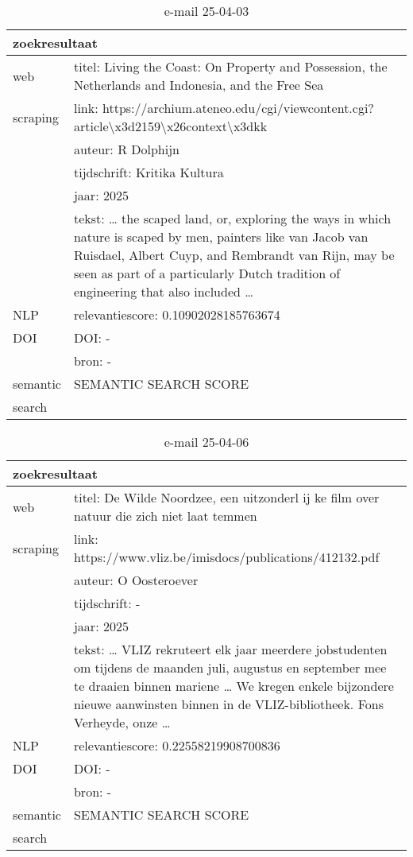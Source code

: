 \begin{table}[h!]
    \caption{e-mail 25-04-03}
    \centering
    \begin{tabularx}{\textwidth}{|p{4cm}|X|} 
        \hline
        \multicolumn{2}{|X|}{\textbf{zoekresultaat}} \\
        \hline
        web &titel: Living the Coast: On Property and Possession, the Netherlands and Indonesia, and the Free Sea\\
        scraping&link: https://archium.ateneo.edu/cgi/viewcontent.cgi?article\textbackslash x3d2159\textbackslash x26context\textbackslash x3dkk\\
        &auteur: R Dolphijn\\
        &tijdschrift: Kritika Kultura\\
        &jaar: 2025\\
        &tekst: … the scaped land, or, exploring the ways in which nature is scaped by men, painters like van Jacob van Ruisdael, Albert Cuyp, and Rembrandt van Rijn, may be seen as part of a particularly Dutch tradition of engineering that also included …\\
        \hline
        NLP&relevantiescore: 0.10902028185763674\\
        \hline
        DOI&DOI: -\\
        &bron: -\\
        \hline
        semantic&SEMANTIC SEARCH SCORE\\
        search&\\
        \hline
    \end{tabularx}
    \label{table:email20250403}
\end{table}
\begin{table}[h!]
    \caption{e-mail 25-04-06}
    \centering
    \begin{tabularx}{\textwidth}{|p{4cm}|X|} 
        \hline
        \multicolumn{2}{|X|}{\textbf{zoekresultaat}} \\
        \hline
        web &titel: De Wilde Noordzee, een uitzonderl ij ke film over natuur die zich niet laat temmen\\
        scraping&link: https://www.vliz.be/imisdocs/publications/412132.pdf\\
        &auteur: O Oosteroever\\
        &tijdschrift: -\\
        &jaar: 2025\\
        &tekst: … VLIZ rekruteert elk jaar meerdere jobstudenten om tijdens de maanden juli, augustus en september mee te draaien binnen mariene … We kregen enkele bijzondere nieuwe aanwinsten binnen in de VLIZ-bibliotheek. Fons Verheyde, onze …\\
        \hline
        NLP&relevantiescore: 0.22558219908700836\\
        \hline
        DOI&DOI: -\\
        &bron: -\\
        \hline
        semantic&SEMANTIC SEARCH SCORE\\
        search&\\
        \hline
    \end{tabularx}
    \label{table:email20250406}
\end{table}

